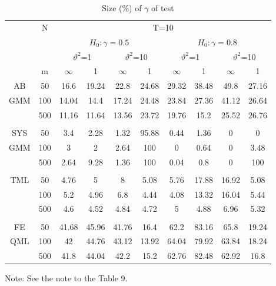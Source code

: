 \documentclass[12pt,a4paper,hyperref]{article}
\begin{document}
\begin{center}
\begin{table}[H]
\caption{Size (\%) of $\gamma$ of test} \label{table10}
\centering
\begin{tabular} {*{10}{c}}
\toprule
&N& \multicolumn{8}{c}{T=10}\\
\cmidrule(lr){3-10}
&& \multicolumn{4}{c}{$H_{0}: \gamma=0.5$} & \multicolumn{4}{c}{$H_{0}: \gamma=0.8$}\\
  \cmidrule(lr){3-6} \cmidrule(lr){7-10}
&&  \multicolumn{2}{c}{$\vartheta^{2}$=1}&\multicolumn{2}{c}{$\vartheta^{2}$=10} & \multicolumn{2}{c}{$\vartheta^{2}$=1}&\multicolumn{2}{c}{$\vartheta^{2}$=10}\\
\cmidrule(lr){3-4} \cmidrule(lr){5-6}\cmidrule(lr){7-8}\cmidrule(lr){9-10}
& m & $\infty$ &1&$\infty$ &1&$\infty$ &1&$\infty$&1\\
\cmidrule(lr){3-4} \cmidrule(lr){5-6}\cmidrule(lr){7-8}\cmidrule(lr){9-10}
AB&50 &16.6&	19.24&	22.8	&24.68&	29.32&	38.48&	49.8	&27.16 \\
GMM&100&14.04&	14.4&	17.24&	24.48	&23.84&	27.36	&41.12	&26.64 \\ 
 &500& 11.16&	11.64&	13.56	&23.72	&19.76	&15.2&	25.52&	26.76 \\
\midrule \\
\cmidrule(lr){3-4} \cmidrule(lr){5-6}\cmidrule(lr){7-8}\cmidrule(lr){9-10}
SYS&50 &3.4&	2.28&	1.32	&95.88	&0.44&	1.36	&0&	0\\
 GMM&100& 3	&2&	2.64	&100	&0	&0.64&	0	&3.48\\  
 &500 &2.64&	9.28&	1.36	&100&	0.04	&0.8&	0	&100\\
\midrule \\
\cmidrule(lr){3-4} \cmidrule(lr){5-6}\cmidrule(lr){7-8}\cmidrule(lr){9-10}
TML &50 	&4.76&	5	&8&	5.08&	5.76&	17.88&	16.92&	5.08\\
&100&5.2	&4.96	&6.8&	4.44&	4.08&	13.32	&16.04	&5.44\\
 &500 & 4.6	&4.52	&4.84&	4.72&	5	&4.88	&6.96&	5.32  \\
 \midrule \\
\cmidrule(lr){3-4} \cmidrule(lr){5-6}\cmidrule(lr){7-8}\cmidrule(lr){9-10}
FE& 50 &41.68&45.96&41.76&16.4	&62.2&83.16	&65.8	&19.24
\\
 QML&100 &42&44.76&	43.12&13.92&64.04&	79.92&	63.84	&18.24
 \\ 
 &500 &41.8&44.04&42.2&15.2&62.76&82.48&	62.92&	16.8
\\ 
\bottomrule
\end{tabular}
\begin{tablenotes}
      \small
      \item Note: See the note to the Table 9.
    \end{tablenotes}
\end{table}
\end{center}
\end{document}
